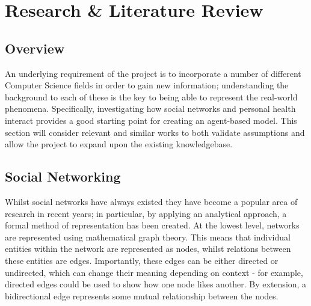 \documentclass[]{report}
\begin{document}
%
%

%
%
\chapter{Research \& Literature Review}
\label{sec:litrev}
\section{Overview}
An underlying requirement of the project is to incorporate a number of different Computer Science fields in order to gain new information; understanding the background to each of these is the key to being able to represent the real-world phenomena. Specifically, investigating how social networks and personal health interact provides a good starting point for creating an agent-based model. This section will consider relevant and similar works to both validate assumptions and allow the project to expand upon the existing knowledgebase.

\section{Social Networking}
\label{sec:litrev-socnet}
Whilst social networks have always existed they have become a popular area of research in recent years; in particular, by applying an analytical approach, a formal method of representation has been created. At the lowest level, networks are represented using mathematical graph theory\cite{NetMark-21}. This means that individual entities within the network are represented as nodes, whilst relations between these entities are edges. Importantly, these edges can be either directed or undirected, which can change their meaning depending on context - for example, directed edges could be used to show how one node likes another\cite{USN-14}. By extension, a bidirectional edge represents some mutual relationship between the nodes.
\end{document}
